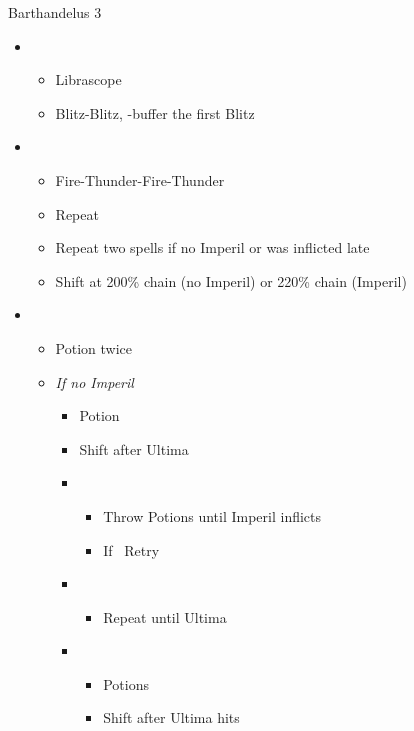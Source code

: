 \begin{battle}[1:24]{Barthandelus 3}
		\begin{itemize}
			\item \second
			      \begin{itemize}
				      \item Librascope
				      \item Blitz-Blitz, \rav-buffer the first Blitz
			      \end{itemize}
			\item \fifth
			      \begin{itemize}
				      \item Fire-Thunder-Fire-Thunder
				      \item Repeat
				      \item Repeat two spells if no Imperil or was inflicted late
				      \item Shift at 200\% chain (no Imperil) or 220\% chain (Imperil)
			      \end{itemize}
			\item \third
			      \begin{itemize}
				      \item Potion twice
				      \item \textit{If no Imperil}
				            \begin{itemize}
					            \item Potion
					            \item Shift after Ultima
					            \item \fifth
					                  \begin{itemize}
						                  \item Throw Potions until Imperil inflicts
						                  \item If \stagger\ Retry
					                  \end{itemize}
					            \item \first
					                  \begin{itemize}
						                  \item Repeat until Ultima
					                  \end{itemize}
					            \item \third
					                  \begin{itemize}
						                  \item Potions
						                  \item Shift after Ultima hits
					                  \end{itemize}

\end{itemize}
\end{itemize}
\end{itemize}
\end{battle}
